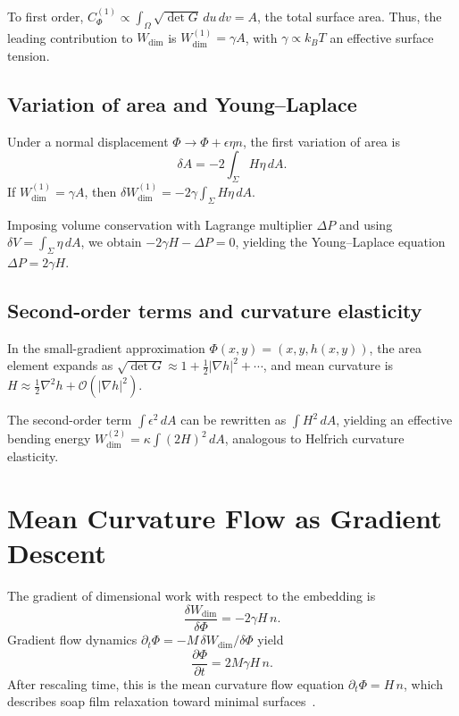 \documentclass[aps,pre,twocolumn,superscriptaddress,floatfix]{revtex4-2}
\begin{document}
To first order, $C_\Phi^{(1)} \propto \int_\Omega \sqrt{\det G}\,du\,dv = A$, the total surface area. Thus, the leading contribution to $W_{\mathrm{dim}}$ is $W_{\mathrm{dim}}^{(1)} = \gamma A$, with $\gamma \propto k_B T$ an effective surface tension.

\subsection{Variation of area and Young--Laplace}

Under a normal displacement $\Phi \to \Phi + \epsilon\eta n$, the first variation of area is
\begin{equation}
\delta A = -2\int_\Sigma H\eta\,dA.
\end{equation}
If $W_{\mathrm{dim}}^{(1)} = \gamma A$, then $\delta W_{\mathrm{dim}}^{(1)} = -2\gamma\int_\Sigma H\eta\,dA$.

Imposing volume conservation with Lagrange multiplier $\Delta P$ and using $\delta V = \int_\Sigma \eta\,dA$, we obtain $-2\gamma H - \Delta P = 0$, yielding the Young--Laplace equation $\Delta P = 2\gamma H$.

\subsection{Second-order terms and curvature elasticity}

In the small-gradient approximation $\Phi(x,y) = (x,y,h(x,y))$, the area element expands as $\sqrt{\det G} \approx 1 + \frac{1}{2}|\nabla h|^2 + \cdots$, and mean curvature is $H \approx \frac{1}{2}\nabla^2 h + \mathcal{O}(|\nabla h|^2)$.

The second-order term $\int \epsilon^2\,dA$ can be rewritten as $\int H^2\,dA$, yielding an effective bending energy $W_{\mathrm{dim}}^{(2)} = \kappa\int(2H)^2\,dA$, analogous to Helfrich curvature elasticity.

\section{Mean Curvature Flow as Gradient Descent}
\label{app:mcf}

The gradient of dimensional work with respect to the embedding is
\begin{equation}
\frac{\delta W_{\mathrm{dim}}}{\delta \Phi} = -2\gamma H\,n.
\end{equation}
Gradient flow dynamics $\partial_t\Phi = -M\,\delta W_{\mathrm{dim}}/\delta\Phi$ yield
\begin{equation}
\frac{\partial\Phi}{\partial t} = 2M\gamma H\,n.
\end{equation}
After rescaling time, this is the mean curvature flow equation $\partial_t\Phi = H\,n$, which describes soap film relaxation toward minimal surfaces~\cite{brakke1978}.
\end{document}
